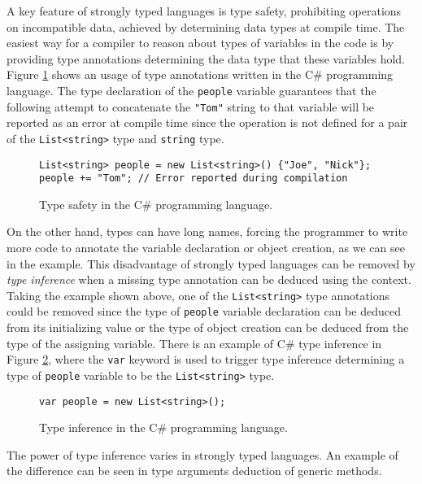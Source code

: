 A key feature of strongly typed languages is type safety, prohibiting operations on incompatible data, achieved by determining data types at compile time. 
The easiest way for a compiler to reason about types of variables in the code is by providing type annotations determining the data type that these variables hold. 
Figure \ref{img01:csharp_type_sef} shows an usage of type annotations written in the C\# programming language.
The type declaration of the \texttt{people} variable guarantees that the following attempt to concatenate the \texttt{"Tom"} string to that variable will be reported as an error at compile time since the operation is not defined for a pair of the \texttt{List<string>} type and \texttt{string} type.
\begin{figure}[h]
\begin{lstlisting}[style=csharp]
List<string> people = new List<string>() {"Joe", "Nick"};
people += "Tom"; // Error reported during compilation
\end{lstlisting}
\caption{Type safety in the C\# programming language.}
\label{img01:csharp_type_sef}
\end{figure}
\par
On the other hand, types can have long names, forcing the programmer to write more code to annotate the variable declaration or object creation, as we can see in the example.
This disadvantage of strongly typed languages can be removed by \textit{type inference} when a missing type annotation can be deduced using the context. 
Taking the example shown above, one of the \texttt{List<string>} type annotations could be removed since the type of \texttt{people} variable declaration can be deduced from its initializing value or the type of object creation can be deduced from the type of the assigning variable.
There is an example of C\# type inference in Figure \ref{img02:csharp_type_inf}, where the \texttt{var} keyword is used to trigger type inference determining a type of \texttt{people} variable to be the \texttt{List<string>} type.
\begin{figure}[h]
\begin{lstlisting}[style=csharp]
var people = new List<string>();
\end{lstlisting}
\caption{Type inference in the C\# programming language.}
\label{img02:csharp_type_inf}
\end{figure}
\par
The power of type inference varies in strongly typed languages.
An example of the difference can be seen in type arguments deduction of generic methods. 
